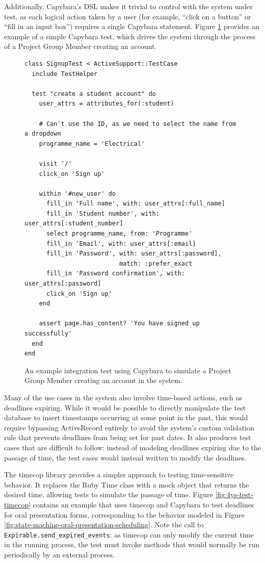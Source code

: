 \documentclass[document.tex]{subfiles}
\begin{document}
Additionally, Capybara's DSL makes it trivial to control with the system under test, as each logical action taken by a user (for example, ``click on a button'' or ``fill in an input box'') requires a single Capybara statement. Figure \ref{fig:4ys-test-signup} provides an example of a simple Capybara test, which drives the system through the process of a Project Group Member creating an account.

\begin{figure}[!ht]
  \begin{lstlisting}
class SignupTest < ActiveSupport::TestCase
  include TestHelper

  test "create a student account" do
    user_attrs = attributes_for(:student)

    # Can't use the ID, as we need to select the name from a dropdown
    programme_name = 'Electrical'

    visit '/'
    click_on 'Sign up'

    within '#new_user' do
      fill_in 'Full name', with: user_attrs[:full_name]
      fill_in 'Student number', with: user_attrs[:student_number]
      select programme_name, from: 'Programme'
      fill_in 'Email', with: user_attrs[:email]
      fill_in 'Password', with: user_attrs[:password],
                          match: :prefer_exact
      fill_in 'Password confirmation', with: user_attrs[:password]
      click_on 'Sign up'
    end

    assert page.has_content? 'You have signed up successfully'
  end
end
  \end{lstlisting}
  \cprotect \caption{An example integration test using Capybara to simulate a Project Group Member creating an account in the system.}
  \label{fig:4ys-test-signup}
\end{figure}


Many of the use cases in the system also involve time-based actions, such as deadlines expiring. While it would be possible to directly manipulate the test database to insert timestamps occurring at some point in the past, this would require bypassing ActiveRecord entirely to avoid the system's custom validation rule that prevents deadlines from being set for past dates. It also produces test cases that are difficult to follow: instead of modeling deadlines expiring due to the passage of time, the test cases would instead written to modify the deadlines.

The timecop library provides a simpler approach to testing time-sensitive behavior. It replaces the Ruby Time class with a mock object that returns the desired time, allowing tests to simulate the passage of time. Figure \ref{fig:4ys-test-timecop} contains an example that uses timecop and Capybara to test deadlines for oral presentation forms, corresponding to the behavior modeled in Figure \ref{fig:state-machine-oral-presentation-scheduling}. Note the call to \verb!Expirable.send_expired_events!: as timecop can only modify the current time in the running process, the test must invoke methods that would normally be run periodically by an external process.
\end{document}
